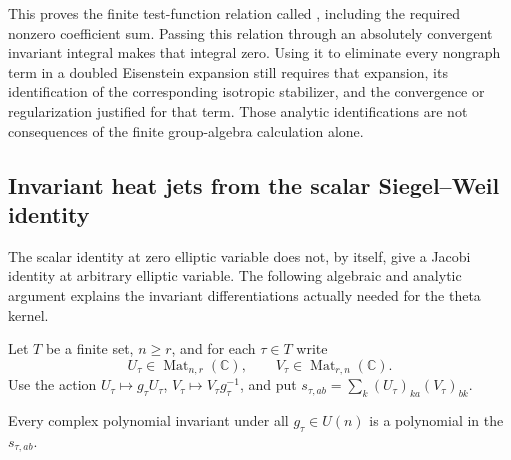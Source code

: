 This proves the finite test-function relation called
, including the required nonzero
coefficient sum.  Passing this relation through an absolutely
convergent invariant integral makes that integral zero.
Using it to eliminate every nongraph term in a doubled
Eisenstein expansion still requires that expansion, its
identification of the corresponding isotropic stabilizer,
and the convergence or regularization justified for that
term.  Those analytic identifications are not consequences
of the finite group-algebra calculation alone.

\subsection{Invariant heat jets from the scalar Siegel--Weil identity}
\label{subsec:sr-invariant-heat-jets}

The scalar identity at zero elliptic variable does not, by
itself, give a Jacobi identity at arbitrary elliptic variable.
The following algebraic and analytic argument explains the
invariant differentiations actually needed for the theta
kernel.

Let \(T\) be a finite set, \(n\ge r\), and for each
\(\tau\in T\) write
\[
 U_\tau\in\operatorname{Mat}_{n,r}(\mathbb C),\qquad
 V_\tau\in\operatorname{Mat}_{r,n}(\mathbb C).
\]
Use the action
\(U_\tau\mapsto g_\tau U_\tau\),
\(V_\tau\mapsto V_\tau g_\tau^{-1}\), and put
\(s_{\tau,ab}=\sum_k(U_\tau)_{ka}(V_\tau)_{bk}\).

\begin{srlemma}\label{lem:sr-invariants-pairings}
Every complex polynomial invariant under all
\(g_\tau\in U(n)\) is a polynomial in the
\(s_{\tau,ab}\).
\end{srlemma}

